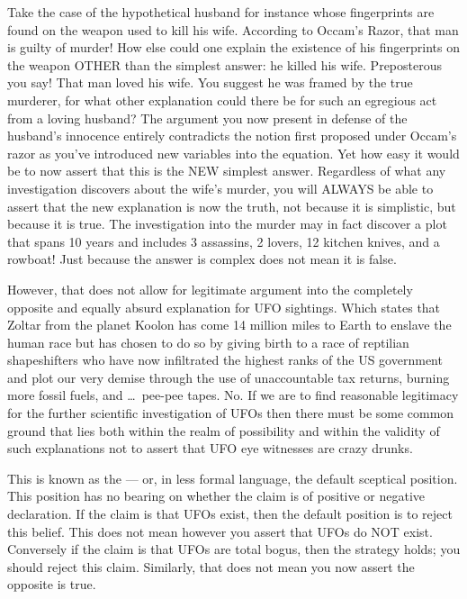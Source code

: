 Take the case of the hypothetical husband for instance whose fingerprints are
found on the weapon used to kill his wife. According to Occam's Razor, that
man is guilty of murder! How else could one explain the existence of his
fingerprints on the weapon OTHER than the simplest answer: he killed his wife.
Preposterous you say! That man loved his wife. You suggest he was framed by the
true murderer, for what other explanation could there be for such an egregious
act from a loving husband? The argument you now present in defense of the
husband's innocence entirely contradicts the notion first proposed under Occam's
razor as you've introduced new variables into the equation. Yet how easy it would
be to now assert that this is the NEW simplest answer. Regardless of what any
investigation discovers about the wife's murder, you will ALWAYS be able to
assert that the new explanation is now the truth, not because it is simplistic,
but because it is true. The investigation into the murder may in fact discover a
plot that spans 10 years and includes 3 assassins, 2 lovers, 12 kitchen knives,
and a rowboat! Just because the answer is complex does not mean it is false.

However, that does not allow for legitimate argument into the completely opposite
and equally absurd explanation for UFO sightings. Which states that Zoltar from
the planet Koolon has come 14 million miles to Earth to enslave the human race but
has chosen to do so by giving birth to a race of reptilian shapeshifters who have
now infiltrated the highest ranks of the US government and plot our very demise
through the use of unaccountable tax returns, burning more fossil fuels,
and \dots\ pee-pee tapes. No. If we are to find reasonable legitimacy for the
further scientific investigation of UFOs then there must be some common ground
that lies both within the realm of possibility and within the validity of such
explanations not to assert that UFO eye witnesses are crazy drunks.

 This is known as
the  --- or, in less formal language, the default sceptical position.
This position has no bearing on whether the claim is of positive or negative
declaration. If the claim is that UFOs exist, then the default position is to
reject this belief. This does not mean however you assert that UFOs do NOT exist.
Conversely if the claim is that UFOs are total bogus, then the strategy holds; you
should reject this claim. Similarly, that does not mean you now assert the opposite
is true. 

